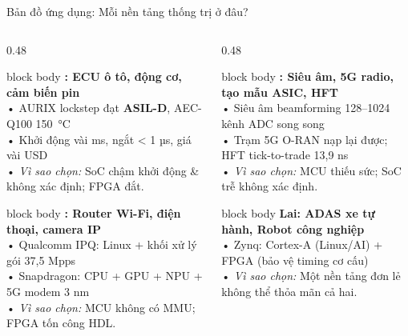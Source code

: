 \begin{frame}{Bản đồ ứng dụng: Mỗi nền tảng thống trị ở đâu?}
\begin{columns}[T]
\begin{column}{0.48\linewidth}
\begin{beamercolorbox}[rounded=true,sep=4pt]{block body}\footnotesize
\textbf{\MCU: ECU ô tô, động cơ, cảm biến pin}\\
• AURIX lockstep đạt \textbf{ASIL-D}, AEC-Q100 150~°C\\
• Khởi động vài ms, ngắt < 1 µs, giá vài USD\\
• \emph{Vì sao chọn:} SoC chậm khởi động \& không xác định; FPGA đắt.
\end{beamercolorbox}
\vspace{3pt}
\begin{beamercolorbox}[rounded=true,sep=4pt]{block body}\footnotesize
\textbf{\SoC: Router Wi-Fi, điện thoại, camera IP}\\
• Qualcomm IPQ: Linux + khối xử lý gói 37,5 Mpps\\
• Snapdragon: CPU + GPU + NPU + 5G modem 3 nm\\
• \emph{Vì sao chọn:} MCU không có MMU; FPGA tốn công HDL.
\end{beamercolorbox}
\end{column}
\begin{column}{0.48\linewidth}
\begin{beamercolorbox}[rounded=true,sep=4pt]{block body}\footnotesize
\textbf{\FPGA: Siêu âm, 5G radio, tạo mẫu ASIC, HFT}\\
• Siêu âm beamforming 128–1024 kênh ADC song song\\
• Trạm 5G O-RAN nạp lại được; HFT tick-to-trade 13,9 ns\\
• \emph{Vì sao chọn:} MCU thiếu sức; SoC trễ không xác định.
\end{beamercolorbox}
\vspace{3pt}
\begin{beamercolorbox}[rounded=true,sep=4pt]{block body}\footnotesize
\textbf{Lai: ADAS xe tự hành, Robot công nghiệp}\\
• Zynq: Cortex-A (Linux/AI) + FPGA (bảo vệ timing cơ cấu)\\
• \emph{Vì sao chọn:} Một nền tảng đơn lẻ không thể thỏa mãn cả hai.
\end{beamercolorbox}
\end{column}
\end{columns}
\end{frame}

